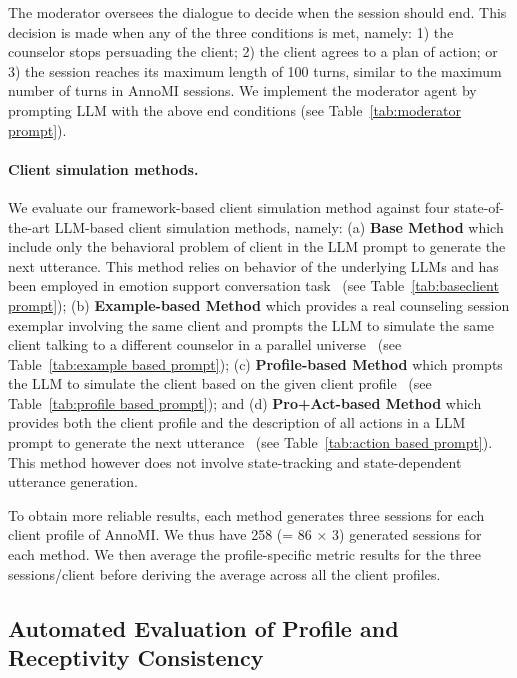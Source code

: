 The moderator oversees the dialogue to decide when the session should end.  This decision is made when any of the three conditions is met, namely: 1) the counselor stops persuading the client; 2) the client agrees to a plan of action; or 3) the session reaches its maximum length of 100 turns, similar to the maximum number of turns in AnnoMI sessions.  We implement the moderator agent by prompting LLM with the above end conditions (see Table~\ref{tab:moderator prompt}). 

\paragraph{Client simulation methods.} We evaluate our framework-based client simulation method against four state-of-the-art LLM-based client simulation methods, namely: (a) \textbf{Base Method} which include only the behavioral problem of client in the LLM prompt to generate the next utterance.  This method relies on behavior of the underlying LLMs and has been employed in emotion support conversation task~\citep{deng2023plug, deng2023prompting} (see Table~\ref{tab:baseclient prompt}); (b) \textbf{Example-based Method} which provides a real counseling session exemplar involving the same client and prompts the LLM to simulate the same client talking to a different counselor in a parallel universe~\citep{chiu2024computational} (see Table~\ref{tab:example based prompt}); (c) \textbf{Profile-based Method} which prompts the LLM to simulate the client based on the given client profile~\citep{yosef2024assessing,wang2024patient} (see Table~\ref{tab:profile based prompt}); and (d) \textbf{Pro+Act-based Method} which provides both the client profile and the description of all actions in a LLM prompt to generate the next utterance~\citep{zhang2024strength} (see Table~\ref{tab:action based prompt}). This method however does not involve state-tracking and state-dependent utterance generation. 
 
To obtain more reliable results, each method generates three sessions for each client profile of AnnoMI. We thus have 258 (= 86 $\times$ 3) generated sessions for each method. We then average the profile-specific metric results for the three sessions/client before deriving the average across all the client profiles. 

\subsection{Automated Evaluation of Profile and Receptivity Consistency}
\label{sec:profile consistency}


